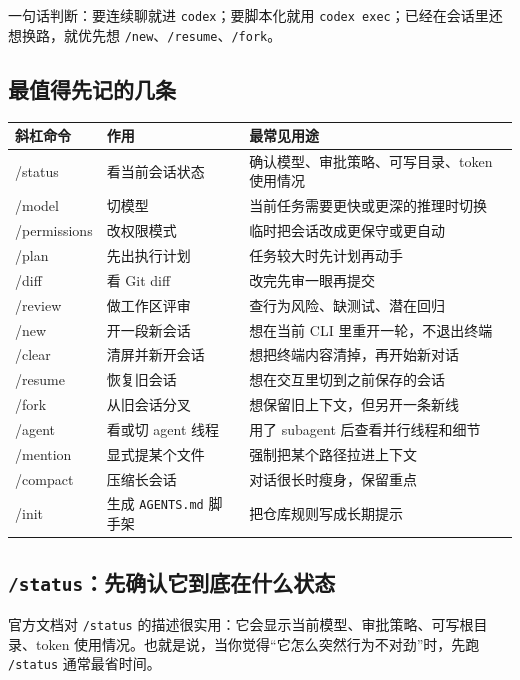 \documentclass[UTF8,a4paper,12pt]{ctexart}
\begin{document}
\begin{tipbox}
一句话判断：要连续聊就进 \texttt{codex}；要脚本化就用 \texttt{codex exec}；已经在会话里还想换路，就优先想 \texttt{/new}、\texttt{/resume}、\texttt{/fork}。
\end{tipbox}

\subsection{最值得先记的几条}

\begin{longtable}{>{\ttfamily}p{} p{} p{}}
\toprule
斜杠命令 & 作用 & 最常见用途 \\
\midrule
\endhead
/status & 看当前会话状态 & 确认模型、审批策略、可写目录、token 使用情况 \\
/model & 切模型 & 当前任务需要更快或更深的推理时切换 \\
/permissions & 改权限模式 & 临时把会话改成更保守或更自动 \\
/plan & 先出执行计划 & 任务较大时先计划再动手 \\
/diff & 看 Git diff & 改完先审一眼再提交 \\
/review & 做工作区评审 & 查行为风险、缺测试、潜在回归 \\
/new & 开一段新会话 & 想在当前 CLI 里重开一轮，不退出终端 \\
/clear & 清屏并新开会话 & 想把终端内容清掉，再开始新对话 \\
/resume & 恢复旧会话 & 想在交互里切到之前保存的会话 \\
/fork & 从旧会话分叉 & 想保留旧上下文，但另开一条新线 \\
/agent & 看或切 agent 线程 & 用了 subagent 后查看并行线程和细节 \\
/mention & 显式提某个文件 & 强制把某个路径拉进上下文 \\
/compact & 压缩长会话 & 对话很长时瘦身，保留重点 \\
/init & 生成 \texttt{AGENTS.md} 脚手架 & 把仓库规则写成长期提示 \\
\bottomrule
\end{longtable}

\subsection{\texttt{/status}：先确认它到底在什么状态}

官方文档对 \texttt{/status} 的描述很实用：它会显示当前模型、审批策略、可写根目录、token 使用情况。也就是说，当你觉得“它怎么突然行为不对劲”时，先跑 \texttt{/status} 通常最省时间。
\end{document}
